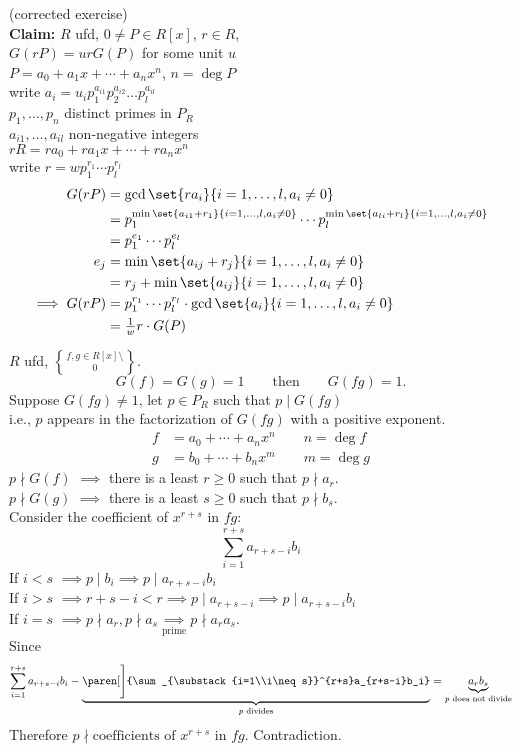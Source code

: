 (corrected exercise) \\
\textbf{Claim: }$R$ ufd, $0\neq P\in R[x]$, $r\in R$, \\
$G(rP)=urG(P)$ for some unit $u$ \\
\pf $P=a_0+a_1x+\dotsb+a_nx^n$, $n=\deg P$ \\
write $a_i=u_ip_1^{a_{i1}}p_2^{a_{i2}}\dotsc p_l^{a_{il}}$ \\
$p_1,\dotsc,p_n$ distinct primes in $P_R$ \\
$a_{i1},\dotsc,a_{il}$ non-negative integers \\
$rR = ra_0+ra_1x+\dotsb+ra_nx^n$ \\
write $r=wp_1^{r_1}\dotsm p_l^{r_l}$ \\
\begin{align*}
G(rP) &= \gcd\set{ra_i}{i=1,\dotsc,l,a_i\neq0} \\
&= p_1^{\min\set{a_{i1}+r_1}{i=1,\dotsc,l,a_i\neq0}}\dotsm p_l^{\min\set{a_{li}+r_l}{i=1,\dotsc,l,a_i\neq0}} \\
&= p_1^{e_1}\dotsm p_l^{e_l} \\
e_j &= \min\set{a_{ij}+r_j}{i=1,\dotsc,l,a_i\neq0} \\
&= r_j + \min\set{a_{ij}}{i=1,\dotsc,l,a_i\neq0} \\
\implies G(rP) &= p_1^{r_1}\dotsm p_l^{r_l}\cdot\gcd\set{a_i}{i=1,\dotsc,l,a_i\neq0} \\
&= \tfrac{1}{w} r \cdot G(P)
\end{align*}

\lem $R$ ufd, $f,g\in R[x]\setminus\brace0$.
\[ G(f)=G(g)=1 \qquad\text{then}\qquad G(fg)=1 . \]
\pf Suppose $G(fg)\neq1$, let $p\in P_R$ such that $p\mid G(fg)$ \\
i.e., $p$ appears in the factorization of $G(fg)$ with a positive exponent.
\begin{align*}
f &= a_0 + \dotsb + a_nx^n \qquad n=\deg f \\
g &= b_0 + \dotsb + b_nx^m \qquad m=\deg g
\end{align*}
$p\nmid G(f)$ $\implies$ there is a least $r\geq0$ such that $p\nmid a_r$. \\
$p\nmid G(g)$ $\implies$ there is a least $s\geq0$ such that $p\nmid b_s$. \\
Consider the coefficient of $x^{r+s}$ in $fg$:
\[ \sum_{i=1}^{r+s} a_{r+s-i}b_i \]
If $i<s$ $\implies p\mid b_i \implies p\mid a_{r+s-i}b_i$ \\
If $i>s$ $\implies r+s-i<r \implies p\mid a_{r+s-i} \implies p\mid a_{r+s-i}b_i$ \\
If $i=s$ $\implies p\nmid a_r, p\nmid a_s\underset{\text{prime}}{\implies}p\nmid a_ra_s$. \\
Since
\[ \sum_{i=1}^{r+s} a_{r+s-i}b_i - \underbrace{\paren[\Bigg]{\sum_{\substack{i=1\\i\neq s}}^{r+s}a_{r+s-i}b_i}}_\text{$p$ divides} = \underbrace{a_r b_s}_\text{$p$ does not divide} \]
Therefore $p\nmid\text{coefficients of $x^{r+s}$ in $fg$}$.  Contradiction.

